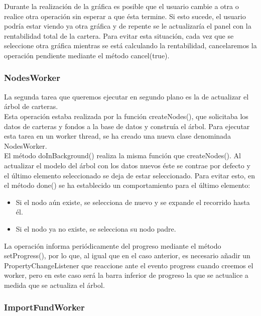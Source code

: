 \documentclass[12pt, a4paper]{book}
\begin{document}
Durante la realización de la gráfica es posible que el usuario cambie a otra o realice otra operación sin esperar a que ésta termine. Si esto sucede, el usuario podría estar viendo ya otra gráfica y de repente se le actualizaría el panel con la rentabilidad total de la cartera. Para evitar esta situación, cada vez que se seleccione otra gráfica mientras se está calculando la rentabilidad, cancelaremos la operación pendiente mediante el método cancel(true).


\subsubsection{NodesWorker}

La segunda tarea que queremos ejecutar en segundo plano es la de actualizar el árbol de carteras.\\

Esta operación estaba realizada por la función createNodes(), que solicitaba los datos de carteras y fondos a la base de datos y construía el árbol. Para ejecutar esta tarea en un worker thread, se ha creado una nueva clase denominada NodesWorker.\\

El método doInBackground() realiza la misma función que createNodes(). Al actualizar el modelo del árbol con los datos nuevos éste se contrae por defecto y el último elemento seleccionado se deja de estar seleccionado. Para evitar esto, en el método done() se ha establecido un comportamiento para el último elemento:

\begin{itemize}
	\item Si el nodo aún existe, se selecciona de nuevo y se expande el recorrido hasta él.
	\item Si el nodo ya no existe, se selecciona su nodo padre.
\end{itemize} 

La operación informa periódicamente del progreso mediante el método setProgress(), por lo que, al igual que en el caso anterior, es necesario añadir un PropertyChangeListener que reaccione ante el evento progress cuando creemos el worker, pero en este caso será la barra inferior de progreso la que se actualice a medida que se actualiza el árbol.

\subsubsection{ImportFundWorker}
\end{document}

